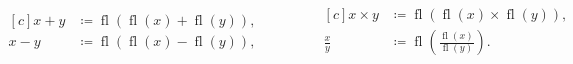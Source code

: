 \begin{frame}
\begin{definition}
		\begin{equation*}
			\begin{aligned}[c]
				x+y & \coloneqq
				\operatorname{fl}
				\left(
				\operatorname{fl}\left(x\right)+
				\operatorname{fl}\left(y\right)
				\right),        \\
				x-y & \coloneqq
				\operatorname{fl}
				\left(
				\operatorname{fl}\left(x\right)-
				\operatorname{fl}\left(y\right)
				\right),
			\end{aligned}
			\qquad\qquad
			\begin{aligned}[c]
				x\times y   & \coloneqq
				\operatorname{fl}
				\left(
				\operatorname{fl}\left(x\right)\times
				\operatorname{fl}\left(y\right)
				\right),                \\
				\frac{x}{y} & \coloneqq
				\operatorname{fl}
				\left(
				\frac{
					\operatorname{fl}\left(x\right)
				}{
					\operatorname{fl}\left(y\right)
				}
				\right).
			\end{aligned}
		\end{equation*}

	\end{definition}
\end{frame}

